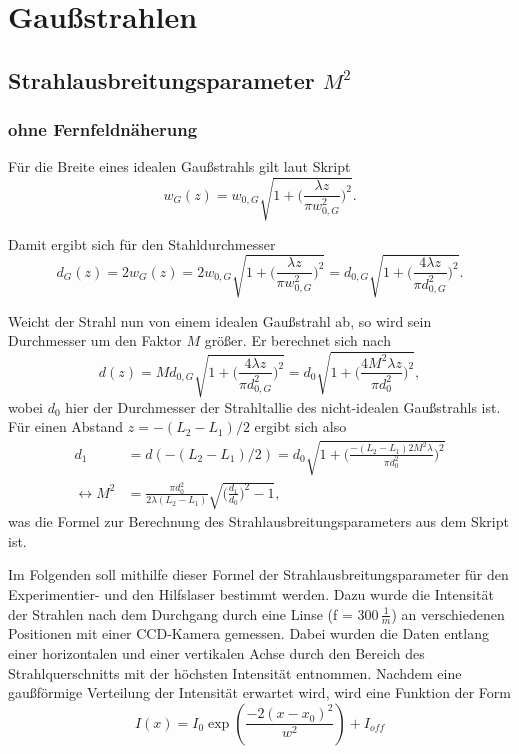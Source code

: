 
\section{Gaußstrahlen}
\label{sec:gauss}

\subsection{Strahlausbreitungsparameter $M^2$}

\subsubsection*{ohne Fernfeldnäherung}

Für die Breite eines idealen Gaußstrahls gilt laut Skript 
\begin{equation*}
    w_G(z) = w_{0,G} \sqrt{1 + \biggl(\frac{\lambda z}{\pi w_{0,G}^2}\biggl)^2}.
\end{equation*}

Damit ergibt sich für den Stahldurchmesser 
\begin{equation*}
    d_G(z) = 2 w_G(z) = 2 w_{0,G} \sqrt{1 + \biggl(\frac{\lambda z}{\pi w_{0,G}^2}\biggl)^2} = d_{0,G} \sqrt{1 + \biggl(\frac{4\lambda z}{\pi d_{0,G}^2}\biggl)^2}.
\end{equation*}

Weicht der Strahl nun von einem idealen Gaußstrahl ab, so wird sein Durchmesser um den Faktor $M$ größer. Er berechnet sich nach
\begin{equation*}
    d(z) = M d_{0,G} \sqrt{1 + \biggl(\frac{4\lambda z}{\pi d_{0,G}^2}\biggl)^2} = d_0 \sqrt{1 +\biggl (\frac{4M^2\lambda z}{\pi d_0^2}\biggl)^2},
\end{equation*}
wobei $d_0$ hier der Durchmesser der Strahltallie des nicht-idealen Gaußstrahls ist.
Für einen Abstand $z = -(L_2-L_1)/2$ ergibt sich also
\begin{align}
    d_1 &= d(-(L_2-L_1)/2) = d_0 \sqrt{1 +\biggl (\frac{-(L_2-L_1)2M^2\lambda}{\pi d_0^2}\biggl)^2} \nonumber \\
    \leftrightarrow M^2 &= \frac{\pi d_0^2}{2 \lambda (L_2-L_1) } \sqrt{\biggl(\frac{d_1}{d_0}\biggl)^2-1},
    \label{eq:M}
\end{align}
was die Formel zur Berechnung des Strahlausbreitungsparameters aus dem Skript ist.

Im Folgenden soll mithilfe dieser Formel der Strahlausbreitungsparameter für den Experimentier- und den Hilfslaser bestimmt werden. Dazu wurde die Intensität der Strahlen 
nach dem Durchgang durch eine Linse (f = 300\,$\frac{1}{m}$) an verschiedenen Positionen mit einer CCD-Kamera gemessen. Dabei wurden die Daten entlang einer horizontalen und 
einer vertikalen Achse durch den Bereich des Strahlquerschnitts mit der höchsten Intensität entnommen. Nachdem eine gaußförmige Verteilung der Intensität erwartet wird, wird 
eine Funktion der Form 
\begin{equation*}
    I(x) = I_0 \exp(\frac{-2(x-x_0)^2}{w^2}) + I_{off}
\end{equation*}

